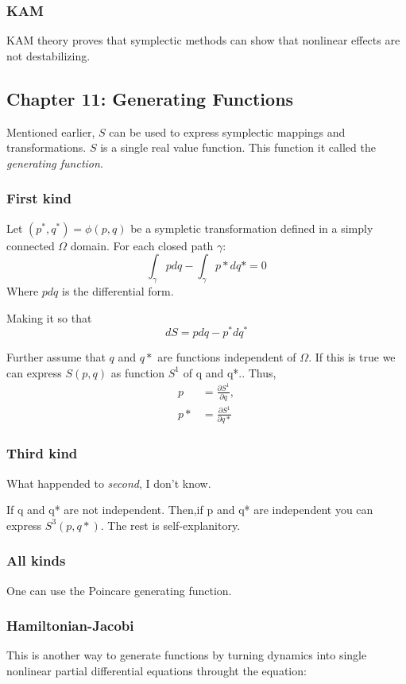 \subsubsection{KAM}
KAM theory proves that symplectic methods can show that nonlinear effects are not destabilizing.

\subsection{Chapter 11: Generating Functions}
Mentioned earlier, $S$ can be used to express symplectic mappings and transformations. $S$ is a single real value function. This function it called
the \emph{generating function}.

\subsubsection{First kind}
Let $(p^*,q^*) = \phi(p, q)$ be a sympletic transformation defined in a simply connected $\Omega$ domain. For each closed path $\gamma$:
$$ \int_\gamma p dq-\int_\gamma p*dq* = 0$$
Where $pdq$ is the differential form.

Making it so that
$$ dS= pdq - p^*dq^* $$

Further assume that $q$ and $q*$ are functions independent of $\Omega$. If this is true we can express $S(p, q) $ as function $S^1$ of q and q*.. Thus,
\begin{align}
p &= \frac{\partial S^1}{\partial q}, \\
p* &= \frac{\partial S^1}{\partial q*}
\end{align} 

\subsubsection{Third kind}
What happended to \emph{second}, I don't know.

If q and q* are not independent. Then,if p and q* are independent you can express $S^3(p, q*)$. The rest is self-explanitory.

\subsubsection{All kinds}
One can use the Poincare generating function.
\subsubsection{Hamiltonian-Jacobi}
This is another way to generate functions by turning dynamics into single nonlinear partial differential equations throught the equation:

